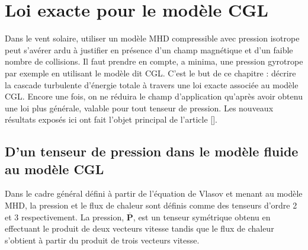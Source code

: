 \chapter{Loi exacte pour le modèle \acs{CGL}}
\renewcommand\partie{\Partie\ Chapitre \thechapter}
\label{ch-21}

\bigskip
\minitoc  

Dans le vent solaire, utiliser un modèle \ac{MHD} compressible avec pression isotrope peut s'avérer ardu à justifier en présence d'un champ magnétique et d'un faible nombre de collisions. Il faut prendre en compte, a minima, une pression gyrotrope par exemple en utilisant le modèle dit \ac{CGL}. C'est le but de ce chapitre : décrire la cascade turbulente d'énergie totale à travers une loi exacte associée au modèle \ac{CGL}. Encore une fois, on ne réduira le champ d'application qu'après avoir obtenu une loi plus générale, valable pour tout tenseur de pression. Les nouveaux résultats exposés ici ont fait l'objet principal de l'article [\cite{simon_exact_2022}].

\section{D'un tenseur de pression dans le modèle fluide au modèle \acs{CGL} }
\label{sec-211}

Dans le cadre général défini à partir de l'équation de Vlasov et menant au modèle \ac{MHD}, la pression et le flux de chaleur sont définis comme des tenseurs d'ordre 2 et 3 respectivement. La pression, $\overline{\boldsymbol{P}} $, est un tenseur symétrique obtenu en effectuant le produit de deux vecteurs vitesse tandis que le flux de chaleur s'obtient à partir du produit de trois vecteurs vitesse. 

